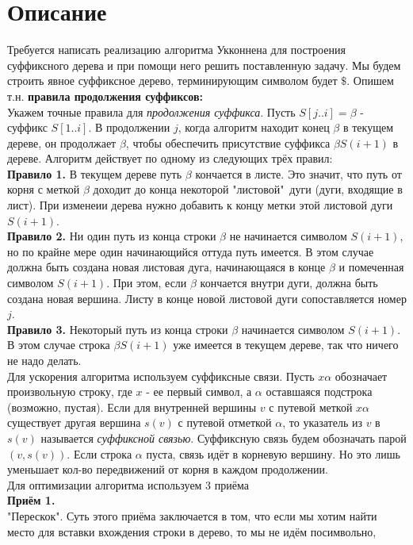 \section{Описание}
Требуется написать реализацию алгоритма Укконнена для построения суффиксного дерева и при помощи него решить поставленную задачу.
Мы будем строить явное суффиксное дерево, терминирующим символом будет $\$$.
Опишем т.н. {\bfseries правила продолжения суффиксов:}
\\Укажем точные правила для \textit {продолжения суффикса}. Пусть $S[j..i] = \beta$ - суффикс $S[1..i]$. В продолжении $j$, когда
алгоритм находит конец $\beta$ в текущем дереве, он продолжает $\beta$, чтобы обеспечить присутствие суффикса $\beta S (i+1)$ в
дереве. Алгоритм действует по одному из следующих трёх правил:
\\{\bfseries Правило 1.} В текущем дереве путь $\beta$ кончается в листе. Это значит, что путь от корня с меткой $\beta$ доходит
до конца некоторой "листовой"\ дуги (дуги, входящие в лист). При изменеии дерева нужно добавить к концу метки этой листовой дуги $S(i+1)$.
\\{\bfseries Правило 2.} Ни один путь из конца строки $\beta$ не начинается символом $S(i+1)$, но по крайне мере один начинающийся оттуда
путь имеется.
В этом случае должна быть создана новая листовая дуга, начинающаяся в конце $\beta$ и помеченная символом $S(i+1)$. При этом, если $\beta$
кончается внутри дуги, должна быть создана новая вершина. Листу в конце новой листовой дуги сопоставляется номер $j$.
\\{\bfseries Правило 3.} Некоторый путь из конца строки $\beta$ начинается символом $S(i+1)$. В этом случае строка $\beta S(i+1)$ уже имеется
в текущем дереве, так что ничего не надо делать.
\\Для ускорения алгоритма используем суффиксные связи. Пусть $x\alpha$ обозначает произвольную строку, где $x$ - ее первый символ, а $\alpha$
оставшаяся подстрока (возможно, пустая). Если для внутренней вершины $v$ с путевой меткой $x\alpha$ существует другая вершина $s(v)$ с путевой
отметкой $\alpha$, то указатель из $v$ в $s(v)$ называется \textit{суффиксной связью}. Суффиксную связь будем обозначать парой $(v, s(v))$.
Если строка $\alpha$ пуста, связь идёт в корневую вершину. Но это лишь уменьшает кол-во передвижений от корня в каждом продолжении.
\\Для оптимизации алгоритма используем 3 приёма
\\{\bfseries Приём 1.}
\\"Перескок". Суть этого приёма заключается в том, что если мы хотим найти место для вставки вхождения строки в дерево, то мы не идём посимвольно,
